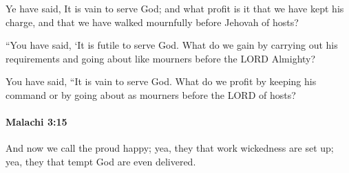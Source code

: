 			\begin{versebox}
					\item[BHS] 
					\item[LXX] 
					\item[ASV] Ye have said, It is vain to serve God; and what profit is it that we have kept his charge, and that we have walked mournfully before Jehovah of hosts?
					\item[NIV] “You have said, ‘It is futile to serve God. What do we gain by carrying out his requirements and going about like mourners before the LORD Almighty?
					\item[NRSV] You have said, “It is vain to serve God. What do we profit by keeping his command or by going about as mourners before the LORD of hosts?
			\end{versebox}

		\paragraph{Malachi 3:15} %
			\label{MALACHI-3-15}

			And now we call the proud happy; yea, they that work wickedness are set up; yea, they that tempt God are even delivered.


